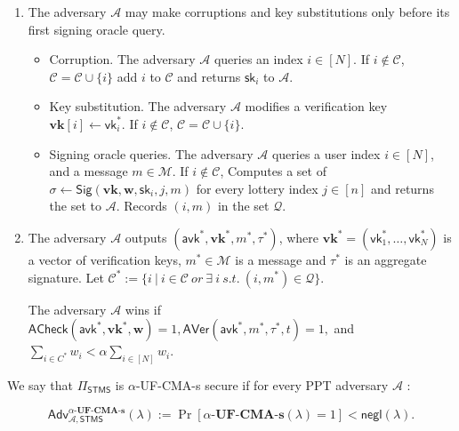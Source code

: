 \documentclass{article}
\newcommand{\sk}[0]{\mathsf{sk}}
\newcommand{\vk}[0]{\mathsf{vk}}
\newcommand{\avk}[0]{\mathsf{avk}}
\begin{document}
{\begin{enumerate}
    
    \item The adversary $\mathcal{A}$ may make corruptions and key substitutions only before its first signing oracle query.
    \begin{itemize}
        \item Corruption. The adversary $\mathcal{A}$ queries an index $i \in [N]$. If $i \notin \mathcal{C}$, $\mathcal{C} = \mathcal{C} \cup \{i\} $ add $i$ to $\mathcal{C}$ and returns $\sk_i$ to $\mathcal{A}$.
        \item Key substitution. The adversary $\mathcal{A}$ modifies a verification key $\mathbf{vk}[i] \leftarrow \vk_i^\ast$. If $i \notin \mathcal{C}$, $\mathcal{C} = \mathcal{C} \cup \{i\}$. 
        \item Signing oracle queries. The adversary $\mathcal{A}$ queries a user index $i \in [N]$, and a message $m \in \mathcal{M}$. 
        If $i \notin \mathcal{C}$, 
        Computes a set of \(\sigma \leftarrow \mathsf{Sig}(\mathbf{vk}, \mathbf{w}, \sk_i, j, m)\) for every lottery index $j \in [n]$ and returns the set to $\mathcal{A}$. Records $(i,m)$ in the set $\mathcal{Q}$.
    \end{itemize}
    \item The adversary $\mathcal{A}$ outputs $(\avk^*,\mathbf{vk}^\ast,m^\ast,\tau^\ast)$, where $\mathbf{vk}^\ast = (\vk^\ast_1,\dots,\vk^\ast_N)$ is a vector of verification keys, $m^\ast \in \mathcal{M}$ is a message and $\tau^\ast$ is an aggregate signature.
    Let \(\mathcal{C}^\ast :=\{i\ |\ i\in \mathcal{C}\ or\ \exists \ i\ s.t. \ (i,m^\ast) \in \mathcal{Q} \} \).
    
    The adversary $\mathcal{A}$ wins if 
    \(\mathsf{ACheck}(\avk^\ast,\mathbf{vk}^\ast,\mathbf{w})=1,
      \mathsf{AVer}(\avk^\ast,m^\ast,\tau^\ast,t)=1,\) and $\sum_{i \in C^\ast} w_i < \alpha \sum_{i \in [N]} w_i . $
    
\end{enumerate}
}

We say that $\Pi_{\mathsf{STMS}}$ is $\alpha$-\textsf{UF-CMA-s} secure if for every PPT adversary $\mathcal{A}$ :

\[
    \mathsf{Adv}^{\alpha\textbf{-UF-CMA-s}}_{\mathcal{A},\mathsf{STMS}}(\lambda) := \Pr[\alpha\textbf{-UF-CMA-s}(\lambda) = 1 ]< \mathsf{negl}(\lambda).
\]
\end{document}
